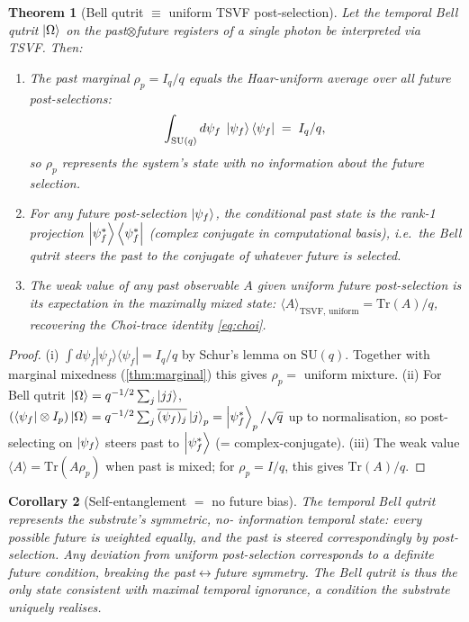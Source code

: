 ﻿\documentclass[12pt]{article}
\newtheorem{theorem}{Theorem}[section]
\newtheorem{corollary}[theorem]{Corollary}
\begin{document}
\begin{theorem}[Bell qutrit $\equiv$ uniform TSVF post-selection]\label{thm:tsvf}
Let the temporal Bell qutrit $\ket{\Omega}$ on the past$\otimes$future
registers of a single photon be interpreted via TSVF.  Then:
\begin{enumerate}[label=(\roman*),noitemsep]
  \item The past marginal $\rho_p = I_q / q$ equals the Haar-uniform
    average over all future post-selections:
    \begin{equation}
      \int_{\mathrm{SU}(q)} d\psi_f\;\ket{\psi_f}\bra{\psi_f}
      \;=\; I_q / q,
    \end{equation}
    so $\rho_p$ represents the system's state with no information about
    the future selection.
  \item For any future post-selection $\ket{\psi_f}$, the conditional past
    state is the rank-1 projection
    $\ket{\psi_f^*}\bra{\psi_f^*}$ (complex conjugate in computational basis),
    i.e.\ the Bell qutrit \emph{steers} the past to the conjugate of
    whatever future is selected.
  \item The weak value of any past observable $A$ given uniform future
    post-selection is its expectation in the maximally mixed state:
    $\langle A\rangle_{\text{TSVF, uniform}} = \mathrm{Tr}(A)/q$, recovering
    the Choi-trace identity \eqref{eq:choi}.
\end{enumerate}
\end{theorem}

\begin{proof}
(i) $\int d\psi_f |\psi_f\rangle\langle\psi_f| = I_q / q$ by Schur's lemma
on $\mathrm{SU}(q)$.  Together with marginal mixedness
(\cref{thm:marginal}) this gives $\rho_p = $ uniform mixture.
(ii) For Bell qutrit $\ket{\Omega} = q^{-1/2}\sum_j\ket{jj}$,
$(\bra{\psi_f}\otimes I_p)\ket{\Omega} = q^{-1/2}\sum_j\overline{(\psi_f)_j}
\ket{j}_p = \ket{\psi_f^*}_p / \sqrt q$ up to normalisation, so post-selecting
on $\ket{\psi_f}$ steers past to $\ket{\psi_f^*}$ (= complex-conjugate).
(iii) The weak value $\langle A\rangle = \mathrm{Tr}(A\rho_p)$ when past
is mixed; for $\rho_p = I/q$, this gives $\mathrm{Tr}(A)/q$.
\end{proof}

\begin{corollary}[Self-entanglement $=$ no future bias]\label{cor:no_bias}
The temporal Bell qutrit represents the substrate's \emph{symmetric, no-
information} temporal state: every possible future is weighted equally,
and the past is steered correspondingly by post-selection.  Any deviation
from uniform post-selection corresponds to a definite future condition,
breaking the past$\leftrightarrow$future symmetry.  The Bell qutrit is
thus the \emph{only} state consistent with maximal temporal ignorance, a
condition the substrate uniquely realises.
\end{corollary}
\end{document}
